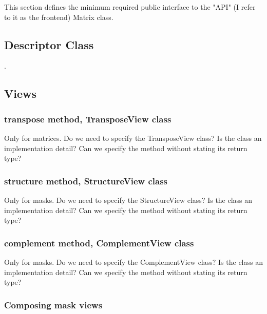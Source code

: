 This section defines the minimum required public interface to the "API" (I refer to it
as the frontend) Matrix class.  

\subsection{Descriptor Class}

.

\subsection{Views}

\subsubsection{transpose method, TransposeView class}

Only for matrices.  Do we need to specify the TransposeView class?
Is the class an implementation detail?  Can we specify the method without stating its return type?


\subsubsection{structure method, StructureView class}

Only for masks.  Do we need to specify the StructureView class?
Is the class an implementation detail?  Can we specify the method without stating its return type?


\subsubsection{complement method, ComplementView class}

Only for masks.  Do we need to specify the ComplementView class?
Is the class an implementation detail?  Can we specify the method without stating its return type?


\subsubsection{Composing mask views}

